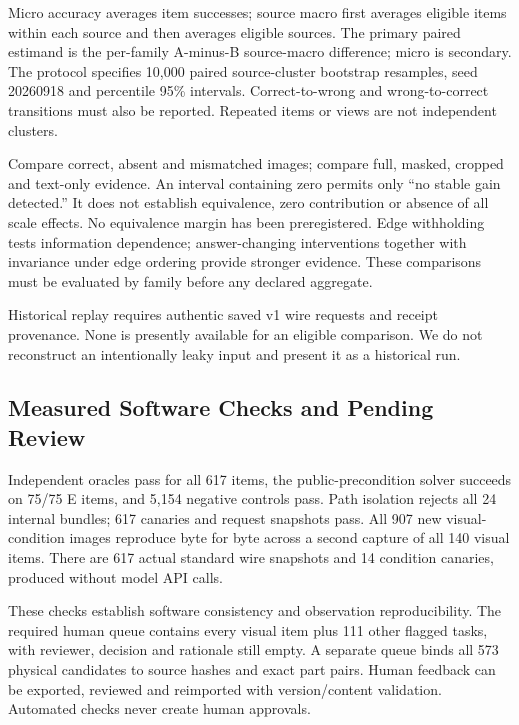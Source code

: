 \documentclass[10pt,twocolumn,letterpaper]{article}
\begin{document}
\begin{table}[t]
\centering\small
\caption{Prospective candidate-family exact success (\%).
All model result cells are blank. The supplement gives adapter IDs
and additional family, resource and review tables.}
\label{tab:models}
\end{table}

Micro accuracy averages item successes; source macro first averages
eligible items within each source and then averages eligible sources.
The primary paired estimand is the per-family A-minus-B source-macro
difference; micro is secondary. The protocol specifies 10,000 paired
source-cluster bootstrap resamples, seed 20260918 and percentile 95\%
intervals. Correct-to-wrong and wrong-to-correct transitions must also
be reported. Repeated items or views are not independent clusters.

Compare correct, absent and mismatched images; compare full, masked,
cropped and text-only evidence. An interval containing zero permits
only ``no stable gain detected.'' It does not establish equivalence,
zero contribution or absence of all scale effects. No equivalence
margin has been preregistered. Edge withholding tests information
dependence; answer-changing interventions together with invariance
under edge ordering provide stronger evidence. These comparisons
must be evaluated by family before any declared aggregate.

Historical replay requires authentic saved v1 wire requests and
receipt provenance. None is presently available for an eligible
comparison. We do not reconstruct an intentionally leaky input and
present it as a historical run.

\subsection{Measured Software Checks and Pending Review}
Independent oracles pass for all 617 items, the public-precondition
solver succeeds on 75/75 E items, and 5,154 negative controls pass.
Path isolation rejects all 24 internal bundles; 617 canaries and
request snapshots pass. All 907 new visual-condition images reproduce
byte for byte across a second capture of all 140 visual items.
There are 617 actual standard wire snapshots and 14 condition
canaries, produced without model API calls.

These checks establish software consistency and observation
reproducibility. The required human queue contains every visual item
plus 111 other flagged tasks, with reviewer, decision and rationale
still empty. A separate queue binds all 573 physical candidates to
source hashes and exact part pairs. Human feedback can be exported,
reviewed and reimported with version/content validation. Automated
checks never create human approvals.
\end{document}

